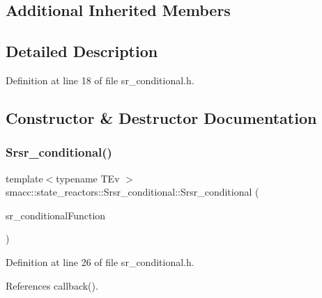 \subsection*{Additional Inherited Members}


\subsection{Detailed Description}


Definition at line 18 of file sr\+\_\+conditional.\+h.



\subsection{Constructor \& Destructor Documentation}
\mbox{\label{classsmacc_1_1state__reactors_1_1Srsr__conditional_a4f36ec873e26c4a8288f08f4d68924d3}} 
\subsubsection{\texorpdfstring{Srsr\+\_\+conditional()}{Srsr\_conditional()}}
{\footnotesize\ttfamily template$<$typename T\+Ev $>$ \\
smacc\+::state\+\_\+reactors\+::\+Srsr\+\_\+conditional\+::\+Srsr\+\_\+conditional (\begin{DoxyParamCaption}\item[{std\+::function$<$ \hyperlink{classbool}{bool}(T\+Ev $\ast$)$>$}]{sr\+\_\+conditional\+Function }\end{DoxyParamCaption})\hspace{0.3cm}{\ttfamily [inline]}}



Definition at line 26 of file sr\+\_\+conditional.\+h.



References callback().


